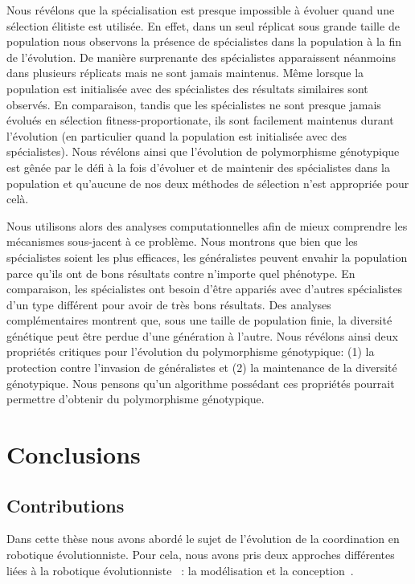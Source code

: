 			Nous révélons que la spécialisation est presque impossible à évoluer quand une sélection élitiste est utilisée. En effet, dans un seul réplicat sous grande taille de population nous observons la présence de spécialistes dans la population à la fin de l'évolution. De manière surprenante des spécialistes apparaissent néanmoins dans plusieurs réplicats mais ne sont jamais maintenus. Même lorsque la population est initialisée avec des spécialistes des résultats similaires sont observés. En comparaison, tandis que les spécialistes ne sont presque jamais évolués en sélection fitness-proportionate, ils sont facilement maintenus durant l'évolution (en particulier quand la population est initialisée avec des spécialistes). Nous révélons ainsi que l'évolution de polymorphisme génotypique est gênée par le défi à la fois d'évoluer et de maintenir des spécialistes dans la population et qu'aucune de nos deux méthodes de sélection n'est appropriée pour celà.

			Nous utilisons alors des analyses computationnelles afin de mieux comprendre les mécanismes sous-jacent à ce problème. Nous montrons que bien que les spécialistes soient les plus efficaces, les généralistes peuvent envahir la population parce qu'ils ont de bons résultats contre n'importe quel phénotype. En comparaison, les spécialistes ont besoin d'être appariés avec d'autres spécialistes d'un type différent pour avoir de très bons résultats. Des analyses complémentaires montrent que, sous une taille de population finie, la diversité génétique peut être perdue d'une génération à l'autre. Nous révélons ainsi deux propriétés critiques pour l'évolution du polymorphisme génotypique: (1) la protection contre l'invasion de généralistes et (2) la maintenance de la diversité génotypique. Nous pensons qu'un algorithme possédant ces propriétés pourrait permettre d'obtenir du polymorphisme génotypique.


\section{Conclusions}

	\subsection{Contributions}

		Dans cette thèse nous avons abordé le sujet de l'évolution de la coordination en robotique évolutionniste. Pour cela, nous avons pris deux approches différentes liées à la robotique évolutionniste~\parencite{Nolfi2000, Doncieux2015a} : la modélisation et la conception~\parencite{Trianni2014b}.

